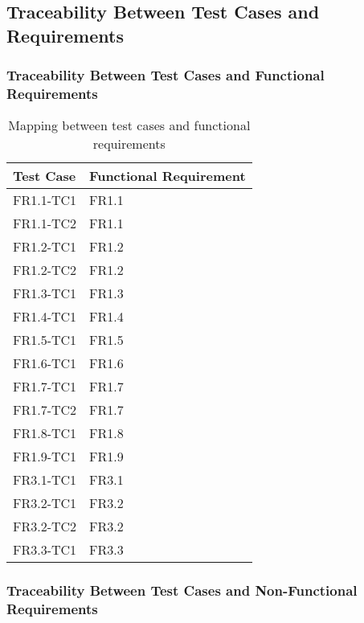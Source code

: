 \documentclass[12pt, titlepage]{article}
\begin{document}
\newpage
\subsection{Traceability Between Test Cases and Requirements}


\subsubsection{Traceability Between Test Cases and Functional Requirements}

\begin{table}[h!]
\begin{tabularx}{\textwidth}{p{5cm}p{5cm}}
\toprule {\bf Test Case} & {\bf Functional Requirement}\\
\midrule 
FR1.1-TC1 & FR1.1\\
FR1.1-TC2 & FR1.1\\
FR1.2-TC1 & FR1.2\\
FR1.2-TC2 & FR1.2\\
FR1.3-TC1 & FR1.3\\
FR1.4-TC1 & FR1.4\\
FR1.5-TC1 & FR1.5\\
FR1.6-TC1 & FR1.6\\
FR1.7-TC1 & FR1.7\\
FR1.7-TC2 & FR1.7\\
FR1.8-TC1 & FR1.8\\
FR1.9-TC1 & FR1.9\\
\midrule
FR3.1-TC1 & FR3.1\\
FR3.2-TC1 & FR3.2\\
FR3.2-TC2 & FR3.2\\
FR3.3-TC1 & FR3.3\\
\bottomrule
\end{tabularx}
\caption{Mapping between test cases and functional requirements}
\end{table}

\newpage
\subsubsection{Traceability Between Test Cases and Non-Functional Requirements}
\end{document}
